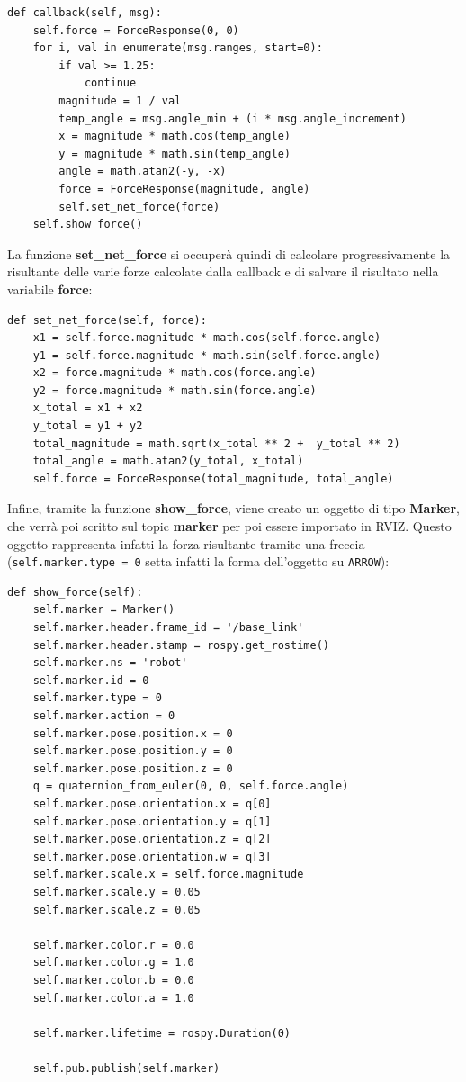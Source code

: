 \documentclass[Lau, binding=0.6cm, oneside]{sapthesis}
\begin{document}
\begin{lstlisting}
def callback(self, msg):
    self.force = ForceResponse(0, 0)
    for i, val in enumerate(msg.ranges, start=0):
        if val >= 1.25:
            continue
        magnitude = 1 / val
        temp_angle = msg.angle_min + (i * msg.angle_increment)
        x = magnitude * math.cos(temp_angle)
        y = magnitude * math.sin(temp_angle)
        angle = math.atan2(-y, -x)
        force = ForceResponse(magnitude, angle)
        self.set_net_force(force)
    self.show_force()
\end{lstlisting}

La funzione \textbf{set\_net\_force} si occuperà quindi di calcolare progressivamente la risultante delle varie forze calcolate dalla callback e di salvare il risultato nella variabile \textbf{force}:

\begin{lstlisting}
def set_net_force(self, force):
    x1 = self.force.magnitude * math.cos(self.force.angle)
    y1 = self.force.magnitude * math.sin(self.force.angle)
    x2 = force.magnitude * math.cos(force.angle)
    y2 = force.magnitude * math.sin(force.angle)
    x_total = x1 + x2
    y_total = y1 + y2
    total_magnitude = math.sqrt(x_total ** 2 +  y_total ** 2)
    total_angle = math.atan2(y_total, x_total)
    self.force = ForceResponse(total_magnitude, total_angle)
\end{lstlisting}

Infine, tramite la funzione \textbf{show\_force}, viene creato un oggetto di tipo \textbf{Marker}, che verrà poi scritto sul topic \textbf{marker} per poi essere importato in RVIZ.
Questo oggetto rappresenta infatti la forza risultante tramite una freccia (\lstinline{self.marker.type = 0} setta infatti la forma dell'oggetto su \lstinline{ARROW}):
\begin{lstlisting}
def show_force(self):
    self.marker = Marker()
    self.marker.header.frame_id = '/base_link'
    self.marker.header.stamp = rospy.get_rostime()
    self.marker.ns = 'robot'
    self.marker.id = 0
    self.marker.type = 0
    self.marker.action = 0
    self.marker.pose.position.x = 0
    self.marker.pose.position.y = 0
    self.marker.pose.position.z = 0
    q = quaternion_from_euler(0, 0, self.force.angle)
    self.marker.pose.orientation.x = q[0]
    self.marker.pose.orientation.y = q[1]
    self.marker.pose.orientation.z = q[2]
    self.marker.pose.orientation.w = q[3]
    self.marker.scale.x = self.force.magnitude
    self.marker.scale.y = 0.05
    self.marker.scale.z = 0.05

    self.marker.color.r = 0.0
    self.marker.color.g = 1.0
    self.marker.color.b = 0.0
    self.marker.color.a = 1.0

    self.marker.lifetime = rospy.Duration(0)

    self.pub.publish(self.marker)
\end{lstlisting}
\end{document}
